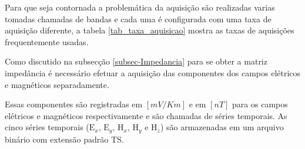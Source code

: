         Para que seja contornada a problemática da aquisição são realizadas varias tomadas chamadas de bandas e cada uma é configurada com uma taxa de aquisição diferente, a tabela \ref{tab_taxa_aquisicao} mostra as taxas de aquisições frequentemente usadas. 
        
        \begin{table}[H]
                \centering
                \caption{Taxas de Aquisições frequentemente usadas para equipamentos ADU06 e ADU07.}
                \label{tab_taxa_aquisicao}
            \end{table}
        
        Como discutido na subsecção \ref{subsec-Impedancia} para se obter a matriz impedância é necessário efetuar a aquisição das componentes dos campos elétricos e magnéticos separadamente.
        
        Essas componentes são registradas em $[mV/Km]$ e em $[nT]$ para os campos elétricos e magnéticos respectivamente e são chamadas de séries temporais. As cinco séries temporais ($\textrm{E}_x,\, \textrm{E}_y, \, \textrm{H}_x, \, \textrm{H}_y \, \, \textrm{e} \, \, \textrm{H}_z$) são armazenadas em um arquivo binário com extensão padrão TS.
        
